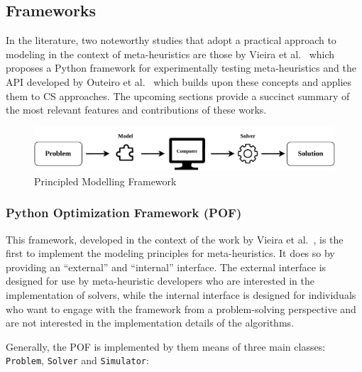 \subsection{Frameworks}

In the literature, two noteworthy studies that adopt a practical approach to
modeling in the context of meta-heuristics are those by Vieira et
al.~\cite{vieira2009uma} which proposes a Python framework for experimentally
testing meta-heuristics and the API developed by Outeiro et
al.~\cite{outeiro2021application} which builds upon these concepts and applies
them to CS approaches. The upcoming sections provide a succinct summary of the
most relevant features and contributions of these works.

\begin{figure}[h]
      \centering
      \includegraphics[width=\textwidth,keepaspectratio]{../assets/modelling/modelling.pdf}
      \caption{Principled Modelling Framework}
      \label{fig:problem-solving}
\end{figure}

\subsubsection{Python Optimization Framework (POF)}

This framework, developed in the context of the work by Vieira et
al.~\cite{vieira2009uma}, is the first to implement the modeling principles for
meta-heuristics. It does so by providing an ``external'' and ``internal'' interface.
The external interface is designed for use by meta-heuristic developers who are
interested in the implementation of solvers, while the internal interface is
designed for individuals who want to engage with the framework from a
problem-solving perspective and are not interested in the implementation details
of the algorithms.

Generally, the POF is implemented by  them means of three main classes:
\texttt{Problem}, \texttt{Solver} and \texttt{Simulator}:

